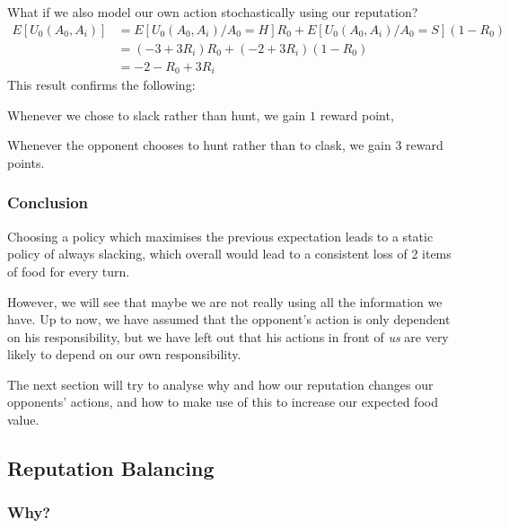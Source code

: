 \documentclass[10pt,fleqn]{article}
\begin{document}
What if we also model our own action stochastically using our reputation?
\begin{align*}
  E[U_0(A_0, A_i)] &= E[U_0(A_0, A_i) / A_0 = H] R_0 + E[U_0(A_0, A_i) / A_0 = S] (1-R_0) \\
                   &= (-3 +3 R_i) R_0 + (-2 +3 R_i) (1-R_0) \\
                   &= -2 - R_0 + 3 R_i
\end{align*}
This result confirms the following:
\begin{inlist}
  \item Whenever we chose to slack rather than hunt, we gain $1$ reward point,
  \item Whenever the opponent chooses to hunt rather than to clask, we gain $3$
    reward points.
\end{inlist}

\subsubsection{Conclusion}
Choosing a policy which maximises the previous expectation leads to a static
policy of always slacking, which overall would lead to a consistent loss of 2
items of food for every turn.

However, we will see that maybe we are not really using all the information we
have. Up to now, we have assumed that the opponent's action is only dependent on
his responsibility, but we have left out that his actions in front of \emph{us}
are very likely to depend on our own responsibility.

The next section will try to analyse why and how our reputation changes our
opponents' actions, and how to make use of this to increase our expected food
value.

\subsection{Reputation Balancing}

\subsubsection{Why?}
\end{document}

